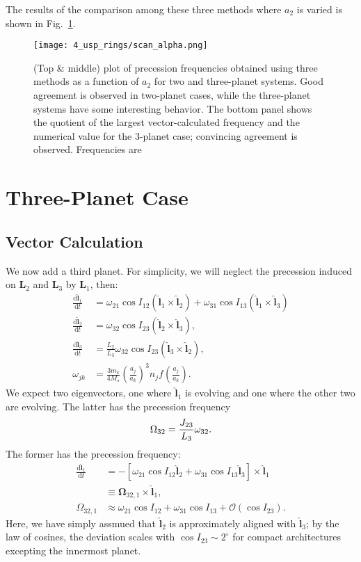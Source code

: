 \documentclass[11pt,
        usenames, %
        dvipsnames %
    ]{article}
\newcommand*{\rd}[2]{\frac{\mathrm{d}#1}{\mathrm{d}#2}}
\newcommand*{\bm}[1]{\boldsymbol{\mathbf{#1}}}
\newcommand*{\uv}[1]{\hat{\bm{#1}}}
\newcommand*{\p}[1]{\left(#1\right)}
\newcommand*{\s}[1]{\left[#1\right]}
\begin{document}
The results of the comparison among these three methods where $a_2$ is varied is
shown in Fig.~\ref{fig:scan}.
\begin{figure}
    \centering
    \texttt{[image: 4\_usp\_rings/scan\_alpha.png]}
    \caption{(Top \& middle) plot of precession frequencies obtained using three
    methods as a function of $a_2$ for two and three-planet systems. Good
    agreement is observed in two-planet cases, while the three-planet systems
    have some interesting behavior. The bottom panel shows the quotient of the
    largest vector-calculated frequency and the numerical value for the 3-planet
    case; convincing agreement is observed. Frequencies are }\label{fig:scan}
\end{figure}

\section{Three-Planet Case}

\subsection{Vector Calculation}

We now add a third planet. For simplicity, we will neglect the precession
induced on $\bm{L}_2$ and $\bm{L}_3$ by $\bm{L}_1$, then:
\begin{align}
    \rd{\uv{l}_1}{t} &= \omega_{21}\cos I_{12} \p{\uv{l}_1 \times \uv{l}_2}
        + \omega_{31}\cos I_{13} \p{\uv{l}_1 \times \uv{l}_3}
        \nonumber\\
    \rd{\uv{l}_2}{t} &= \omega_{32}\cos I_{23} \p{\uv{l}_2 \times \uv{l}_3},\\
    \rd{\uv{l}_3}{t} &= \frac{L_2}{L_3}
        \omega_{32}\cos I_{23} \p{\uv{l}_3 \times \uv{l}_2},\\
    \omega_{jk}
        &= \frac{3 m_k}{4 M_\star}\p{\frac{a_j}{a_k}}^3 n_j
            f\p{\frac{a_j}{a_k}}.
\end{align}
We expect two eigenvectors, one where $\uv{l}_1$ is evolving and one where the
other two are evolving. The latter has the precession frequency
\begin{equation}
    \Omega_{\rm 32} = \frac{J_{23}}{L_3}\omega_{32}.
\end{equation}
The former has the precession frequency:
\begin{align}
    \rd{\uv{l}_1}{t} &= -\s{
        \omega_{21}\cos I_{12} \uv{l}_2 + \omega_{31}\cos I_{13} \uv{l}_3
    } \times \uv{l}_1 \nonumber\\
        &\equiv \bm{\Omega}_{32,1} \times \uv{l}_1,\\
    \Omega_{32, 1}
        &\approx \omega_{21} \cos I_{12}
            + \omega_{31}\cos I_{13}
            + \mathcal{O}\p{\cos I_{23}}.
\end{align}
Here, we have simply assmued that $\uv{l}_2$ is approximately aligned with
$\uv{l}_3$; by the law of cosines, the deviation scales with $\cos I_{23} \sim
2^\circ$ for compact architectures excepting the innermost planet.
\end{document}
